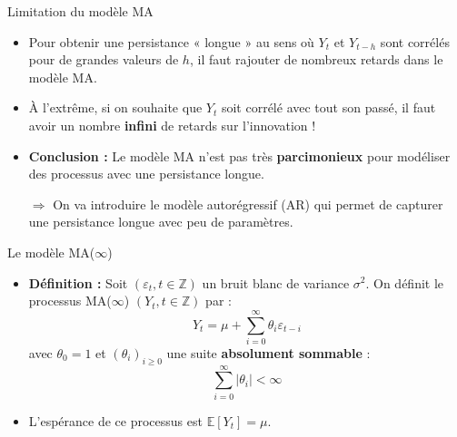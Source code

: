 \documentclass[11pt,aspectratio=169]{beamer}
\newcommand{\E}{\mathbb{E}}
\newcommand{\Z}{\mathbb{Z}}
\begin{document}
\begin{frame}{Limitation du modèle MA}

\begin{itemize}

\item Pour obtenir une persistance « longue » au sens où $Y_t$ et $Y_{t-h}$ sont corrélés pour de grandes valeurs de $h$, il faut rajouter de nombreux retards dans le modèle MA.\newline

\item À l'extrême, si on souhaite que $Y_t$ soit corrélé avec tout son passé, il faut avoir un nombre \textbf{infini} de retards sur l'innovation !\newline

\item \textbf{Conclusion :} Le modèle MA n'est pas très \textbf{parcimonieux} pour modéliser des processus avec une persistance longue.

$\Rightarrow$ On va introduire le modèle autorégressif (AR) qui permet de capturer une persistance longue avec peu de paramètres.

\end{itemize}
\end{frame}


\begin{frame}{Le modèle MA($\infty$)}

\begin{itemize}

\item \textbf{Définition :} Soit $(\varepsilon_t, t \in \Z)$ un bruit blanc de variance $\sigma^2$. On définit le processus MA($\infty$) $(Y_t, t \in \Z)$ par :
\[
Y_t = \mu + \sum_{i=0}^{\infty} \theta_i \varepsilon_{t-i}
\]
avec $\theta_0 = 1$ et $(\theta_i)_{i \geq 0}$ une suite \textbf{absolument sommable} :
\[
\sum_{i=0}^{\infty} |\theta_i| < \infty
\]

\item L'espérance de ce processus est $\E[Y_t] = \mu$.

\end{itemize}
\end{frame}
\end{document}
